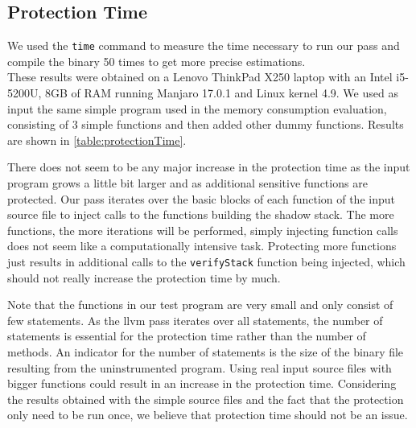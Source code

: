 \documentclass{llncs}
\begin{document}
\subsection{Protection Time}
We used the \texttt{time} command to measure the time necessary to run our pass and compile the binary 50 times to get more precise estimations.\\
These results were obtained on a Lenovo ThinkPad X250 laptop with an Intel i5-5200U, 8GB of RAM running Manjaro 17.0.1 and Linux kernel 4.9.
We used as input the same simple program used in the memory consumption evaluation, consisting of 3 simple functions and then added other dummy functions. Results are shown in \autoref{table:protectionTime}.

There does not seem to be any major increase in the protection time as the input program grows a little bit larger and as additional sensitive functions are protected. Our pass iterates over the basic blocks of each function of the input source file to inject calls to the functions building the shadow stack. The more functions, the more iterations will be performed, simply injecting function calls does not seem like a computationally intensive task. Protecting more functions just results in additional calls to the \texttt{verifyStack} function being injected, which should not really increase the protection time by much.

Note that the functions in our test program are very small and only consist of few statements. As the llvm pass iterates over all statements, the number of statements is essential for the protection time rather than the number of methods. An indicator for the number of statements is the size of the binary file resulting from the uninstrumented program. Using real input source files with bigger functions could result in an increase in the protection time. Considering the results obtained with the simple source files and the fact that the protection only need to be run once, we believe that protection time should not be an issue.
\end{document}
